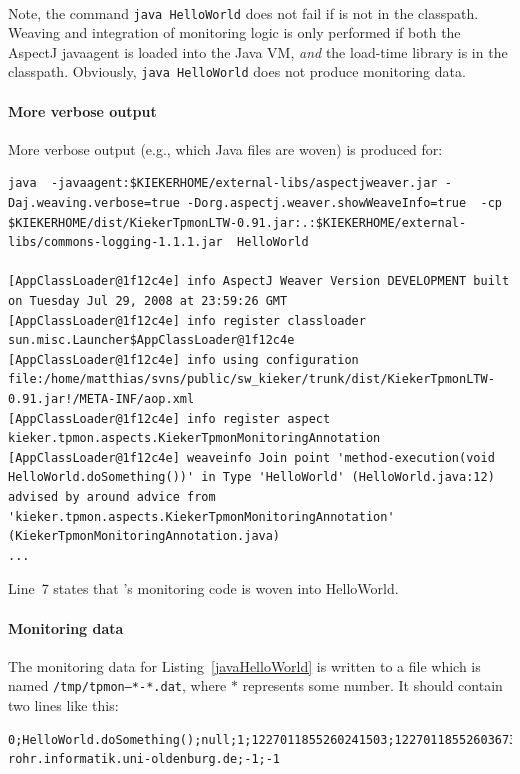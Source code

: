 \documentclass[a4paper,12pt]{scrartcl}
\begin{document}
\

Note, the command \texttt{java  HelloWorld} does not fail if \tpmon{} is not in the classpath. Weaving and integration of monitoring logic is only performed if both the AspectJ javaagent is loaded into the Java VM, \textit{and} the \tpmon{} load-time library is in the classpath. Obviously, \texttt{java  HelloWorld} does not produce monitoring data.

\paragraph{More verbose output}
More verbose output (e.g., which Java files are woven) is produced for:
\begin{lstlisting}[caption={Verbose execution with AspectJ's Java agent.},label={lst2},language=clean,basicstyle=\ttfamily\footnotesize,keywordstyle=\ttfamily\footnotesize]
java  -javaagent:$KIEKERHOME/external-libs/aspectjweaver.jar -Daj.weaving.verbose=true -Dorg.aspectj.weaver.showWeaveInfo=true  -cp $KIEKERHOME/dist/KiekerTpmonLTW-0.91.jar:.:$KIEKERHOME/external-libs/commons-logging-1.1.1.jar  HelloWorld

[AppClassLoader@1f12c4e] info AspectJ Weaver Version DEVELOPMENT built on Tuesday Jul 29, 2008 at 23:59:26 GMT
[AppClassLoader@1f12c4e] info register classloader sun.misc.Launcher$AppClassLoader@1f12c4e
[AppClassLoader@1f12c4e] info using configuration file:/home/matthias/svns/public/sw_kieker/trunk/dist/KiekerTpmonLTW-0.91.jar!/META-INF/aop.xml
[AppClassLoader@1f12c4e] info register aspect kieker.tpmon.aspects.KiekerTpmonMonitoringAnnotation
[AppClassLoader@1f12c4e] weaveinfo Join point 'method-execution(void HelloWorld.doSomething())' in Type 'HelloWorld' (HelloWorld.java:12) advised by around advice from 'kieker.tpmon.aspects.KiekerTpmonMonitoringAnnotation' (KiekerTpmonMonitoringAnnotation.java)
...
\end{lstlisting}
Line~7 states that \tpmon{}'s monitoring code is woven into HelloWorld.

\paragraph{Monitoring data}
The monitoring data for Listing~\ref{javaHelloWorld} is written to a file which is named \texttt{/tmp/tpmon--*-*.dat}, where $*$ represents some number. It should contain two lines like this:
\begin{lstlisting}[caption={Example monitoring data},label={OutputHelloWorld2},language=clean,basicstyle=\ttfamily\footnotesize,keywordstyle=\ttfamily\footnotesize]
0;HelloWorld.doSomething();null;1;1227011855260241503;1227011855260367357;pc-rohr.informatik.uni-oldenburg.de;-1;-1
\end{lstlisting}
\end{document}
